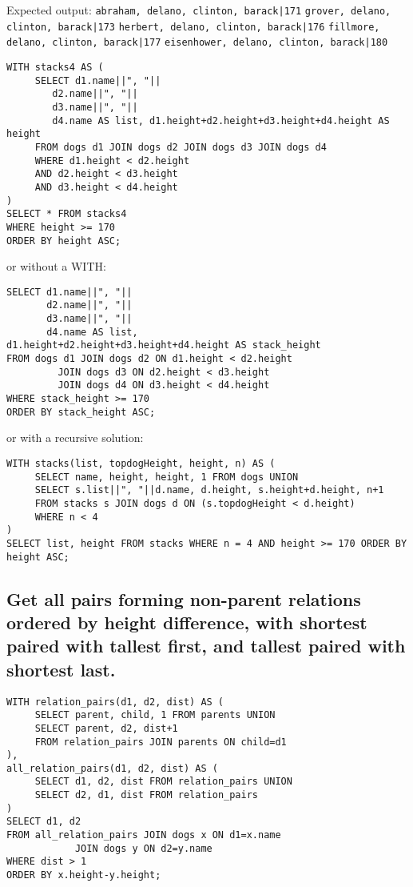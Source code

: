 \documentclass[11pt]{article}
\begin{document}
Expected output:
\texttt{abraham, delano, clinton, barack|171}
\texttt{grover, delano, clinton, barack|173}
\texttt{herbert, delano, clinton, barack|176}
\texttt{fillmore, delano, clinton, barack|177}
\texttt{eisenhower, delano, clinton, barack|180}

\begin{verbatim}
WITH stacks4 AS (
     SELECT d1.name||", "||
	    d2.name||", "||
	    d3.name||", "||
	    d4.name AS list, d1.height+d2.height+d3.height+d4.height AS height
     FROM dogs d1 JOIN dogs d2 JOIN dogs d3 JOIN dogs d4
     WHERE d1.height < d2.height
     AND d2.height < d3.height
     AND d3.height < d4.height
)
SELECT * FROM stacks4
WHERE height >= 170
ORDER BY height ASC;
\end{verbatim}

or without a WITH:
\begin{verbatim}
SELECT d1.name||", "||
       d2.name||", "||
       d3.name||", "||
       d4.name AS list,                 d1.height+d2.height+d3.height+d4.height AS stack_height
FROM dogs d1 JOIN dogs d2 ON d1.height < d2.height
	     JOIN dogs d3 ON d2.height < d3.height
	     JOIN dogs d4 ON d3.height < d4.height
WHERE stack_height >= 170
ORDER BY stack_height ASC;
\end{verbatim}

or with a recursive solution:
\begin{verbatim}
WITH stacks(list, topdogHeight, height, n) AS (
     SELECT name, height, height, 1 FROM dogs UNION
     SELECT s.list||", "||d.name, d.height, s.height+d.height, n+1
     FROM stacks s JOIN dogs d ON (s.topdogHeight < d.height)
     WHERE n < 4
)
SELECT list, height FROM stacks WHERE n = 4 AND height >= 170 ORDER BY height ASC;
\end{verbatim}

\subsection{Get all pairs forming non-parent relations ordered by height difference, with shortest paired with tallest first, and tallest paired with shortest last.}
\label{sec-3-5}
\begin{verbatim}
WITH relation_pairs(d1, d2, dist) AS (
     SELECT parent, child, 1 FROM parents UNION
     SELECT parent, d2, dist+1
     FROM relation_pairs JOIN parents ON child=d1
),
all_relation_pairs(d1, d2, dist) AS (
     SELECT d1, d2, dist FROM relation_pairs UNION
     SELECT d2, d1, dist FROM relation_pairs
)
SELECT d1, d2
FROM all_relation_pairs JOIN dogs x ON d1=x.name
			JOIN dogs y ON d2=y.name
WHERE dist > 1
ORDER BY x.height-y.height;
\end{verbatim}
\end{document}
